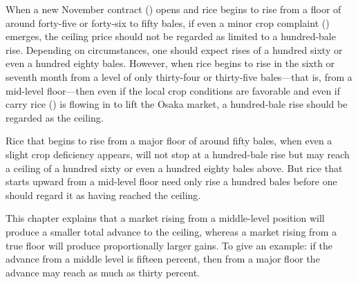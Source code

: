 \begin{sokyubox}
{\small\itshape\color{sokyubar} }

\medskip
When a new November contract () opens and
rice begins to rise from a floor of around forty-five or forty-six
to fifty bales, if even a minor crop complaint ()
emerges, the ceiling price should not be regarded as limited to a
hundred-bale rise. Depending on circumstances, one should expect
rises of a hundred sixty or even a hundred eighty bales. However,
when rice begins to rise in the sixth or seventh month from a level
of only thirty-four or thirty-five bales---that is, from a
mid-level floor---then even if the local crop conditions are
favorable and even if carry rice () is flowing in
to lift the Osaka market, a hundred-bale rise should be regarded
as the ceiling.
\end{sokyubox}

\commentary
Rice that begins to rise from a major floor of around fifty bales,
when even a slight crop deficiency appears, will not stop at a
hundred-bale rise but may reach a ceiling of a hundred sixty or
even a hundred eighty bales above. But rice that starts upward
from a mid-level floor need only rise a hundred bales before one
should regard it as having reached the ceiling.

This chapter explains that a market rising from a middle-level
position will produce a smaller total advance to the ceiling,
whereas a market rising from a true floor will produce
proportionally larger gains. To give an example: if the advance
from a middle level is fifteen percent, then from a major floor
the advance may reach as much as thirty percent.


